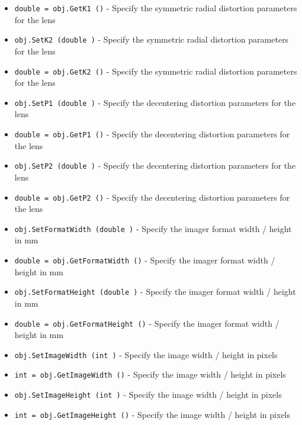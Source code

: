 \begin{itemize}
\item  \verb|double = obj.GetK1 ()| -  Specify the symmetric radial distortion parameters for the lens

\item  \verb|obj.SetK2 (double )| -  Specify the symmetric radial distortion parameters for the lens

\item  \verb|double = obj.GetK2 ()| -  Specify the symmetric radial distortion parameters for the lens

\item  \verb|obj.SetP1 (double )| -  Specify the decentering distortion parameters for the lens

\item  \verb|double = obj.GetP1 ()| -  Specify the decentering distortion parameters for the lens

\item  \verb|obj.SetP2 (double )| -  Specify the decentering distortion parameters for the lens

\item  \verb|double = obj.GetP2 ()| -  Specify the decentering distortion parameters for the lens

\item  \verb|obj.SetFormatWidth (double )| -  Specify the imager format width / height in mm

\item  \verb|double = obj.GetFormatWidth ()| -  Specify the imager format width / height in mm

\item  \verb|obj.SetFormatHeight (double )| -  Specify the imager format width / height in mm

\item  \verb|double = obj.GetFormatHeight ()| -  Specify the imager format width / height in mm

\item  \verb|obj.SetImageWidth (int )| -  Specify the image width / height in pixels

\item  \verb|int = obj.GetImageWidth ()| -  Specify the image width / height in pixels

\item  \verb|obj.SetImageHeight (int )| -  Specify the image width / height in pixels

\item  \verb|int = obj.GetImageHeight ()| -  Specify the image width / height in pixels

\end{itemize}
